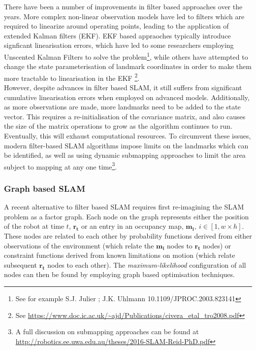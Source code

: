 \documentclass[capstone_report.tex]{subfiles}
\begin{document}
    There have been a number of improvements in filter based approaches over the years. More complex non-linear observation models have led to filters which are required to linearize around operating points, leading to the application of extended Kalman filters (EKF). EKF based appraoches typically introduce signficant linearisation errors, which have led to some researchers employing Unscented Kalman Filters to solve the problem\footnote{See for example S.J. Julier ; J.K. Uhlmann 10.1109/JPROC.2003.823141}, while others have attempted to change the state parameterisation of landmark coordinates in order to make them more tractable to linearisation in the EKF \footnote{See \url{https://www.doc.ic.ac.uk/~ajd/Publications/civera_etal_tro2008.pdf}}. \\

    However, despite advances in filter based SLAM, it still suffers from significant cumulative linearisation errors when employed on advanced models. Additionally, as more observations are made, more landmarks need to be added to the state vector. This requires a re-initialisation of the covariance matrix, and also causes the size of the matrix operations to grow as the algorithm continues to run. Eventually, this will exhaust computational resources. To circumvent these issues, modern filter-based SLAM algorithms impose limits on the landmarks which can be identified, as well as using dynamic submapping approaches to limit the area subject to mapping at any one time\footnote{A full discussion on submapping approaches can be found at \url{http://robotics.ee.uwa.edu.au/theses/2016-SLAM-Reid-PhD.pdf}}.\\

    \subsubsection{Graph based SLAM}
    A recent alternative to filter based SLAM requires first re-imagining the SLAM problem as a factor graph. Each node on the graph represents either the position of the robot at time $t$, $\bm{r_t}$ or an entry in an occupancy map, $\bm{m_i}, \ i\in[1,w\times h]$. These nodes are related to each other by probability functions derived from either observations of the environment (which relate the $\bm{m_i}$ nodes to $\bm{r_t}$ nodes) or constraint functions derived from known limitations on motion (which relate subsequent $\bm{r_t}$ nodes to each other). The \emph{maximum-likelihood} configuration of all nodes can then be found by employing graph based optimisation techniques. \\
\end{document}
